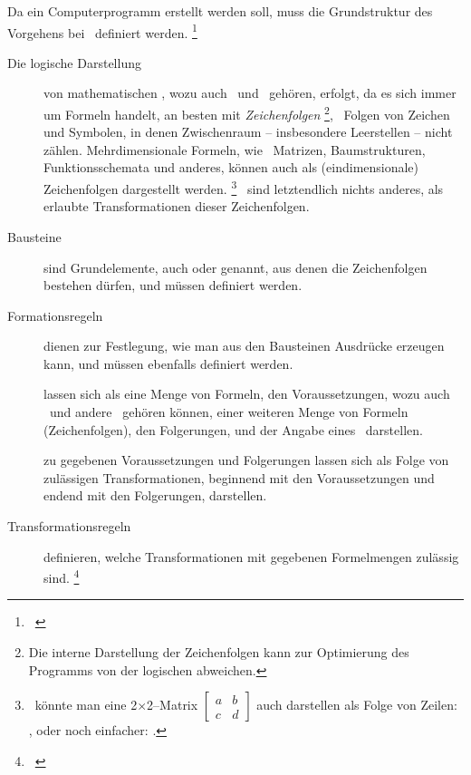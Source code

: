 Da ein Computerprogramm erstellt werden soll, muss die Grundstruktur des Vorgehens bei \Beweisen\ definiert werden.%
\footnote{\seename~\cite{bib:Kalkuel}}

\begin{description}
	\item[Die logische Darstellung] von mathematischen \Aussagen, wozu auch \Axiome\ und \Saetze\ gehören, erfolgt, da es sich immer um Formeln handelt, an besten mit \emph{Zeichenfolgen}%
	\footnote{%
		Die interne Darstellung der Zeichenfolgen kann zur Optimierung des Programms von der logischen abweichen.
	},
	\textdh\ Folgen von Zeichen und Symbolen, in denen Zwischenraum -- insbesondere Leerstellen -- nicht zählen.
	Mehrdimensionale Formeln, wie \textzB\ Matrizen, Baumstrukturen, Funktionsschemata und anderes, können auch als (eindimensionale) Zeichenfolgen dargestellt werden.%
	\footnote{%
		\textZB\ könnte man eine 2$\times$2--Matrix $\begin{bmatrix}
			a & b \\ c & d \end{bmatrix}$ auch darstellen als Folge von Zeilen: \seqqt{$[(a,b),(c,d)]$}, oder noch einfacher: \seqqt{$[a,b;c,d]$}.
	}
	\Beweise\ sind letztendlich nichts anderes, als erlaubte Transformationen dieser Zeichenfolgen.
	\item[Bausteine] sind Grundelemente, auch  oder  genannt, aus denen die Zeichenfolgen bestehen dürfen, und müssen definiert werden.
	\item[Formationsregeln] dienen zur Festlegung, wie man aus den Bausteinen Ausdrücke erzeugen kann, und müssen ebenfalls definiert werden.
	\item[\Saetze] lassen sich als eine Menge von Formeln, den Voraussetzungen, wozu auch \Axiome\ und andere \Saetze\ gehören können, einer weiteren Menge von Formeln (Zeichenfolgen), den Folgerungen, und der Angabe eines \Beweises\ darstellen.
	\item[\Beweise] zu gegebenen Voraussetzungen und Folgerungen lassen sich als Folge von zulässigen Transformationen, beginnend mit den Voraussetzungen und endend mit den Folgerungen, darstellen.
	\item[Transformationsregeln] definieren, welche Transformationen mit gegebenen Formelmengen zulässig sind.%
	\footnote{\seename~\cite{bib:Rautenberg,bib:Schlussregel,bib:NatuerlichesSchliessen}}
\end{description}

\Endchapter
